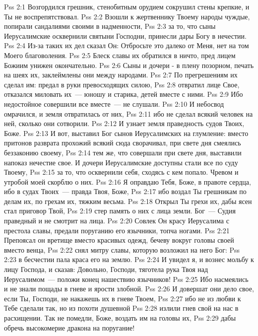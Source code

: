\vs Pss 2:1
Возгордился грешник, стенобитным орудием сокрушил стены
крепкие, и Ты не воспрепятствовал.
\vs Pss 2:2
Взошли к жертвеннику Твоему народы чуждые, попирали сандалиями
своими в надменности,
\vs Pss 2:3
за то, что сыны Иерусалимские осквернили святыни Господни,
принесли дары Богу в нечестии.
\vs Pss 2:4
Из-за таких их дел сказал Он: Отбросьте это далеко от Меня, нет
на том Моего благоволения.
\vs Pss 2:5
Блеск славы их обратился в ничто, пред лицем Божиим унижен
окончательно.
\vs Pss 2:6
Сыны и дочери - в плену позорном, печать на шеях их,
заклеймлены они между народами.
\vs Pss 2:7
По прегрешениям их сделал им: предал в руки превосходящих
силою,
\vs Pss 2:8
отвратил лице Свое, отказался миловать их~--- юношу и
старика, детей вместе с ними.
\vs Pss 2:9
Ибо недостойное совершили все вместе~--- не слушали.
\vs Pss 2:10
И небосвод омрачился, и земля отвратилась от них,
\vs Pss 2:11
ибо не сделал всякий человек на ней, сколько они сотворили.
\vs Pss 2:12
И узнает земля праведность судов Твоих, Боже.
\vs Pss 2:13
И вот, выставил Бог сынов Иерусалимских на глумление: вместо
притонов разврата прохожий всякий сюда
сворачивал, при свете дня смеялись беззаконию своему,
\vs Pss 2:14
тем же, что совершали при свете дня, выставили напоказ нечестие
свое.
И дочери Иерусалимские доступны стали все по суду Твоему,
\vs Pss 2:15
за то, что осквернили себя, сходясь с кем попало. Чревом и утробой
моей скорблю о них.
\vs Pss 2:16
Я оправдаю Тебя, Боже, в правоте сердца, ибо в судах
Твоих~--- правда Твоя, Боже,
\vs Pss 2:17
ибо воздал Ты грешникам по делам их, по грехам их, тяжким
весьма.
\vs Pss 2:18
Открыл Ты грехи их, дабы ясен стал приговор Твой,
\vs Pss 2:19
стер память о них с лица земли.
Бог~--- Судия праведный и не смотрит на лица.
\vs Pss 2:20
Совлек Он красу Иерусалима с престола славы, предали поруганию его
язычники, топча ногами.
\vs Pss 2:21
Препоясал он вретище вместо красивых одежд, бечеву вокруг головы
своей вместо венца,
\vs Pss 2:22
снял митру славы, которую возложил на него Бог:
\vs Pss 2:23
в бесчестии пала краса его на землю.
\vs Pss 2:24
И увидел я, и вознес мольбу к лицу Господа, и сказав: Довольно,
Господи, тяготела рука Твоя над Иерусалимом~--- положи конец нашествию
язычников!
\vs Pss 2:25
Ибо насмеялись и не знали пощады в гневе и ярости злобной.
\vs Pss 2:26
И довершат они дело свое, если Ты, Господи, не накажешь их в гневе
Твоем,
\vs Pss 2:27
ибо не из любви к Тебе сделали так, но из похоти душевной
\vs Pss 2:28
излили гнев свой на нас в расхищении.
Так не помедли, Боже, воздать им на головы их,
\vs Pss 2:29
дабы обречь высокомерие дракона на поругание!
